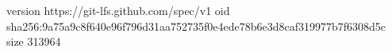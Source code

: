 version https://git-lfs.github.com/spec/v1
oid sha256:9a75a9c8f640e96f796d31aa752735f0e4ede78b6e3d8caf319977b7f6308d5c
size 313964
